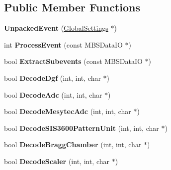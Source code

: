 \subsection*{Public Member Functions}
\begin{DoxyCompactItemize}
\item 
\hypertarget{class_unpacked_event_a399f80fef86fdaf260c67d0868e39006}{{\bfseries Unpacked\-Event} (\hyperlink{class_global_settings}{Global\-Settings} $\ast$)}\label{class_unpacked_event_a399f80fef86fdaf260c67d0868e39006}

\item 
\hypertarget{class_unpacked_event_a719e676645566cd033f53ad047fea2e8}{int {\bfseries Process\-Event} (const M\-B\-S\-Data\-I\-O $\ast$)}\label{class_unpacked_event_a719e676645566cd033f53ad047fea2e8}

\item 
\hypertarget{class_unpacked_event_a654a1c6f241b56cf4e3cb18606e98101}{bool {\bfseries Extract\-Subevents} (const M\-B\-S\-Data\-I\-O $\ast$)}\label{class_unpacked_event_a654a1c6f241b56cf4e3cb18606e98101}

\item 
\hypertarget{class_unpacked_event_a1473955edd8aced26b25f4aa4ea1cc99}{bool {\bfseries Decode\-Dgf} (int, int, char $\ast$)}\label{class_unpacked_event_a1473955edd8aced26b25f4aa4ea1cc99}

\item 
\hypertarget{class_unpacked_event_a5d1e95803242426e747e325bf5f41882}{bool {\bfseries Decode\-Adc} (int, int, char $\ast$)}\label{class_unpacked_event_a5d1e95803242426e747e325bf5f41882}

\item 
\hypertarget{class_unpacked_event_a8622b91904185be6dbca1b27d629d3b3}{bool {\bfseries Decode\-Mesytec\-Adc} (int, int, char $\ast$)}\label{class_unpacked_event_a8622b91904185be6dbca1b27d629d3b3}

\item 
\hypertarget{class_unpacked_event_aace1ccd22e30b9b188b06db28e406ef2}{bool {\bfseries Decode\-S\-I\-S3600\-Pattern\-Unit} (int, int, char $\ast$)}\label{class_unpacked_event_aace1ccd22e30b9b188b06db28e406ef2}

\item 
\hypertarget{class_unpacked_event_adbce67a2bb15ce234e133ce686324762}{bool {\bfseries Decode\-Bragg\-Chamber} (int, int, char $\ast$)}\label{class_unpacked_event_adbce67a2bb15ce234e133ce686324762}

\item 
\hypertarget{class_unpacked_event_a9b1491e6809f949d582348f4855671a9}{bool {\bfseries Decode\-Scaler} (int, int, char $\ast$)}\label{class_unpacked_event_a9b1491e6809f949d582348f4855671a9}


\end{DoxyCompactItemize}
